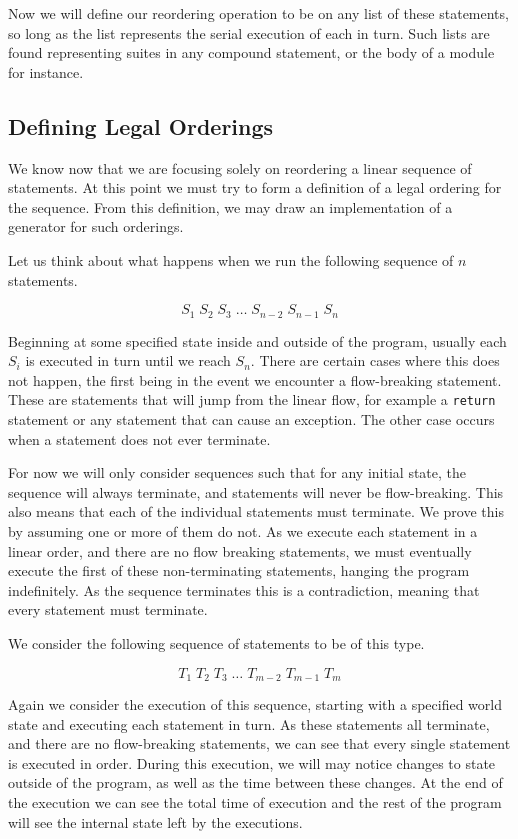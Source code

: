 \documentclass[twoside,a4paper]{report}
\begin{document}
Now we will define our reordering operation to be on any list of these statements, so long as the list represents the serial execution of each in turn.
Such lists are found representing suites in any compound statement, or the body of a module for instance.

\subsection{Defining Legal Orderings}

We know now that we are focusing solely on reordering a linear sequence of statements. At this point we must try to form a definition of a legal ordering
for the sequence. From this definition, we may draw an implementation of a generator for such orderings.

Let us think about what happens when we run the following sequence of $n$ statements.

$$S_1 \; S_2 \; S_3 \; \ldots \; S_{n-2} \; S_{n-1} \; S_n$$

Beginning at some specified state inside and outside of the program, usually each $S_i$ is executed in turn until we reach $S_n$. There are certain cases where
this does not happen, the first being in the event we encounter a flow-breaking statement. These are statements that will jump from the linear flow, for
example a \texttt{return} statement or any statement that can cause an exception. The other case occurs when a statement does not ever terminate.

For now we will only consider sequences such that for any initial state, the sequence will always terminate, and statements will never be flow-breaking. This also
means that each of the individual statements must terminate. We prove this by assuming one or more of them do not. As we execute each statement in a linear
order, and there are no flow breaking statements, we must eventually execute the first of these non-terminating statements, hanging the program indefinitely.
As the sequence terminates this is a contradiction, meaning that every statement must terminate.

We consider the following sequence of statements to be of this type.

$$T_1 \; T_2 \; T_3 \; \ldots \; T_{m-2} \; T_{m-1} \; T_m$$

Again we consider the execution of this sequence, starting with a specified world state and executing each statement in turn. As these statements all terminate,
and there are no flow-breaking statements, we can see that every single statement is executed in order. During this execution, we will may notice changes to state
outside of the program, as well as the time between these changes. At the end of the execution we can see the total time of execution and the rest of the program
will see the internal state left by the executions.
\end{document}
